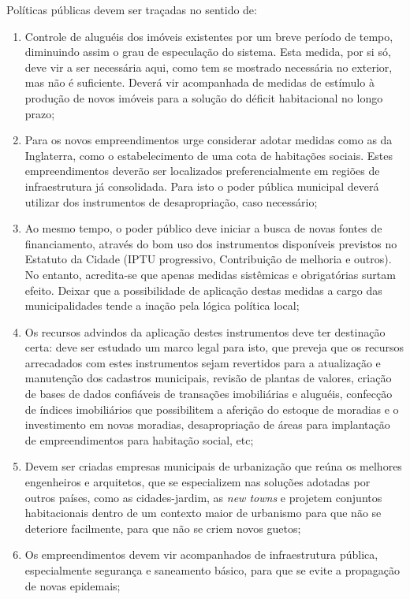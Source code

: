 \documentclass[
	12pt,				%
	oneside,			%
	a4paper,			%
	chapter=TITLE,		%
	section=TITLE,		%
	english,			%
	brazil				%
	]{abntex2}
\begin{document}
\begin{refsection}
Políticas públicas devem ser traçadas no sentido de:
\begin{enumerate}
\def\labelenumi{\arabic{enumi}.}
\item
  Controle de aluguéis dos imóveis existentes por um breve período de tempo,
  diminuindo assim o grau de especulação do sistema. Esta medida, por si só, deve
  vir a ser necessária aqui, como tem se mostrado necessária no exterior, mas não
  é suficiente. Deverá vir acompanhada de medidas de estímulo à produção de novos
  imóveis para a solução do déficit habitacional no longo prazo;
\item
  Para os novos empreendimentos urge considerar adotar medidas como as da
  Inglaterra, como o estabelecimento de uma cota de habitações sociais. Estes
  empreendimentos deverão ser localizados preferencialmente em regiões de
  infraestrutura já consolidada. Para isto o poder pública municipal deverá
  utilizar dos instrumentos de desapropriação, caso necessário;
\item
  Ao mesmo tempo, o poder público deve iniciar a busca de novas fontes de
  financiamento, através do bom uso dos instrumentos disponíveis previstos no
  Estatuto da Cidade (IPTU progressivo, Contribuição de melhoria e outros). No
  entanto, acredita-se que apenas medidas sistêmicas e obrigatórias surtam
  efeito. Deixar que a possibilidade de aplicação destas medidas a cargo das
  municipalidades tende a inação pela lógica política local;
\item
  Os recursos advindos da aplicação destes instrumentos deve ter destinação
  certa: deve ser estudado um marco legal para isto, que preveja que os recursos
  arrecadados com estes instrumentos sejam revertidos para a atualização e
  manutenção dos cadastros municipais, revisão de plantas de valores, criação de
  bases de dados confiáveis de transações imobiliárias e aluguéis, confecção de
  índices imobiliários que possibilitem a aferição do estoque de moradias e o
  investimento em novas moradias, desapropriação de áreas para implantação de
  empreendimentos para habitação social, etc;
\item
  Devem ser criadas empresas municipais de urbanização que reúna os melhores
  engenheiros e arquitetos, que se especializem nas soluções adotadas por outros
  países, como as cidades-jardim, as \emph{new towns} e projetem conjuntos
  habitacionais dentro de um contexto maior de urbanismo para que não se deteriore
  facilmente, para que não se criem novos guetos;
\item
  Os empreendimentos devem vir acompanhados de infraestrutura pública,
  especialmente segurança e saneamento básico, para que se evite a propagação de
  novas epidemais;
\end{enumerate}
\hypertarget{objetivo-1}{%
}
\end{refsection}
\end{document}
